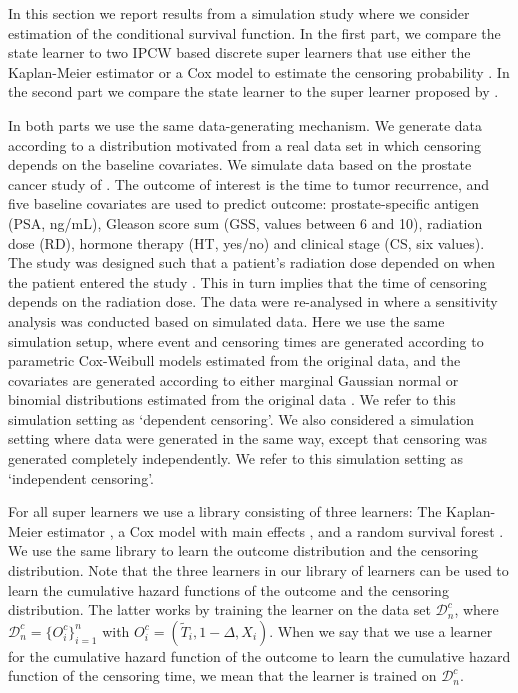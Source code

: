 \documentclass[11pt]{article}
\theoremstyle{thmstyleone}%
\theoremstyle{thmstyletwo}%
\theoremstyle{thmstylethree}%
\newcommand{\1}{\mathds{1}}
\newcommand{\data}{\ensuremath{\mathcal{D}}}
\begin{document}
In this section we report results from a simulation study where we consider
estimation of the conditional survival function. In the first part, we compare
the state learner to two IPCW based discrete super learners that use either the
Kaplan-Meier estimator or a Cox model to estimate the censoring probability
\citep{gonzalez2021stacked}. In the second part we compare the state learner to
the super learner proposed by \cite{westling2021inference}.

In both parts we use the same data-generating mechanism. We generate data
according to a distribution motivated from a real data set in which censoring
depends on the baseline covariates. We simulate data based on the prostate
cancer study of \cite{kattan2000pretreatment}. The outcome of interest is the
time to tumor recurrence, and five baseline covariates are used to predict
outcome: prostate-specific antigen (PSA, ng/mL), Gleason score sum (GSS, values
between 6 and 10), radiation dose (RD), hormone therapy (HT, yes/no) and
clinical stage (CS, six values). The study was designed such that a patient's
radiation dose depended on when the patient entered the study
\citep{gerds2013estimating}. This in turn implies that the time of censoring
depends on the radiation dose. The data were re-analysed in
\citep{gerds2013estimating} where a sensitivity analysis was conducted based on
simulated data. Here we use the same simulation setup, where event and censoring
times are generated according to parametric Cox-Weibull models estimated from
the original data, and the covariates are generated according to either marginal
Gaussian normal or binomial distributions estimated from the original data
\citep[c.f.,][Section~4.6]{gerds2013estimating}. We refer to this simulation
setting as `dependent censoring'. We also considered a simulation setting where
data were generated in the same way, except that censoring was generated
completely independently. We refer to this simulation setting as `independent
censoring'.

For all super learners we use a library consisting of three learners:
The Kaplan-Meier estimator
\citep{kaplan1958nonparametric,Gerds_2019prodlim}, a Cox model with
main effects \citep{cox1972regression, survival-package}, and a random
survival forest \citep{ishwaran2008random,rfsrc-paclage}. We use the
same library to learn the outcome distribution and the censoring
distribution. Note that the three learners in our library of learners
can be used to learn the cumulative hazard functions of the 
outcome and the censoring distribution. The latter works by
training the learner on the data set \( \data_n^c \), where
\( \data_n^c = \{O_i^c\}_{i=1}^n \) with
\( O_i^c = (\tilde{T}_i, 1-\Delta, X_i) \). When we say that we use a
learner for the cumulative hazard function of the outcome to learn the
cumulative hazard function of the censoring time, we mean that the
learner is trained on \( \data_n^c \).
\end{document}
